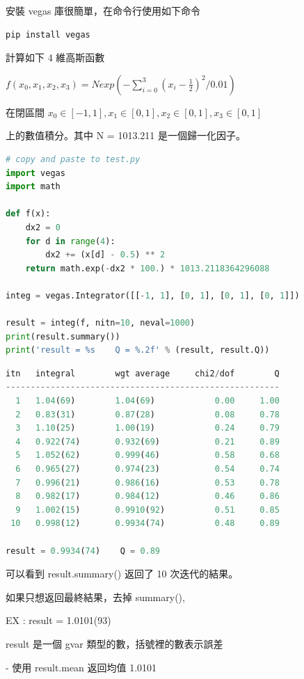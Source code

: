 \documentclass[10pt,UTF8]{ctexart}
\begin{document}
安裝 vegas 庫很簡單，在命令行使用如下命令

\begin{lstlisting}[language={python}]
pip install vegas
\end{lstlisting}

計算如下 4 維高斯函數

$f(x_{0}, x_{1}, x_{2}, x_{3}) = N exp( - \sum_{i=0}^{3} (x_{i} - \frac{1}{2})^{2} / 0.01 )$

在閉區間 $x_{0} \in [-1, 1], x_{1} \in [0, 1], x_{2} \in [0, 1], x_{3} \in [0, 1]$

上的數值積分。其中 N = 1013.211 是一個歸一化因子。

\begin{lstlisting}[language={python}]
# copy and paste to test.py
import vegas
import math

def f(x):
    dx2 = 0
    for d in range(4):
        dx2 += (x[d] - 0.5) ** 2
    return math.exp(-dx2 * 100.) * 1013.2118364296088

integ = vegas.Integrator([[-1, 1], [0, 1], [0, 1], [0, 1]])

result = integ(f, nitn=10, neval=1000)
print(result.summary())
print('result = %s    Q = %.2f' % (result, result.Q))
\end{lstlisting}

\begin{lstlisting}[language={python}]
itn   integral        wgt average     chi2/dof        Q
-------------------------------------------------------
  1   1.04(69)        1.04(69)            0.00     1.00
  2   0.83(31)        0.87(28)            0.08     0.78
  3   1.10(25)        1.00(19)            0.24     0.79
  4   0.922(74)       0.932(69)           0.21     0.89
  5   1.052(62)       0.999(46)           0.58     0.68
  6   0.965(27)       0.974(23)           0.54     0.74
  7   0.996(21)       0.986(16)           0.53     0.78
  8   0.982(17)       0.984(12)           0.46     0.86
  9   1.002(15)       0.9910(92)          0.51     0.85
 10   0.998(12)       0.9934(74)          0.48     0.89

result = 0.9934(74)    Q = 0.89
\end{lstlisting}

可以看到 result.summary() 返回了 10 次迭代的結果。

如果只想返回最終結果，去掉 summary(),

EX : result = 1.0101(93)

result 是一個 gvar 類型的數，括號裡的數表示誤差

- 使用 result.mean 返回均值 1.0101
\end{document}
